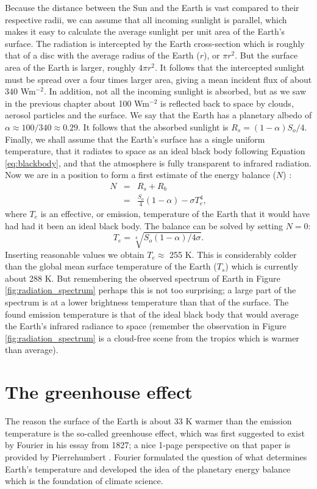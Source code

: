 \documentclass[12pt]{book}
\begin{document}
Because the distance between the Sun and the Earth is vast compared to their respective radii, we can assume that all incoming sunlight is parallel, which makes it easy to calculate the average sunlight per unit area of the Earth's surface. The radiation is intercepted by the Earth cross-section which is roughly that of a disc with the average radius of the Earth ($r$), or $\pi r^2$. But the surface area of the Earth is larger, roughly $4\pi r^2$. It follows that the intercepted sunlight must be spread over a four times larger area, giving a mean incident flux of about 340 Wm$^{-2}$. In addition, not all the incoming sunlight is absorbed, but as we saw in the previous chapter about 100 Wm$^{-2}$ is reflected back to space by clouds, aerosol particles and the surface. We say that the Earth has a planetary albedo of $\alpha \approx 100/340 \approx 0.29$. It follows that the absorbed sunlight is $R_s=(1-\alpha)S_o/4$. Finally, we shall assume that the Earth's surface has a single uniform temperature, that it radiates to space as an ideal black body following Equation \ref{eq:blackbody}, and that the atmosphere is fully transparent to infrared radiation.
Now we are in a position to form a first estimate of the energy balance ($N$) :
\begin{eqnarray}
N &=& R_s + R_b \nonumber \\ 
   &=& \frac{S_o}{4}(1-\alpha) - \sigma T_e^4,
\label{eq:black_body_energy_balance}
\end{eqnarray}
\noindent where $T_e$ is an effective, or emission, temperature of the Earth that it would have had had it been an ideal black body. The balance  can be solved by setting $N=0$:
\begin{equation}
T_e = \sqrt[4]{S_o(1-\alpha)/4\sigma}. 
\end{equation}
Inserting reasonable values we obtain $T_e \approx$  255 K. This is considerably colder than the global mean surface temperature of the Earth ($T_s$) which is currently about 288 K. But remembering the observed spectrum of Earth in Figure \ref{fig:radiation_spectrum} perhaps this is not too surprising; a large part of the spectrum is at a lower brightness temperature than that of the surface. The found emission temperature is that of the ideal black body that would average the Earth's infrared radiance to space (remember the observation in Figure \ref{fig:radiation_spectrum} is a cloud-free scene from the tropics which is warmer than average).

\section{The greenhouse effect}
The reason the surface of the Earth is about 33 K warmer than the emission temperature is the so-called greenhouse effect, which was first suggested to exist by Fourier in his essay from 1827; a nice 1-page perspective on that paper is provided by Pierrehumbert \cite{Pierrehumbert2004}. Fourier formulated the question of what determines Earth's temperature and developed the idea of the planetary energy balance which is the foundation of climate science. 
\end{document}
